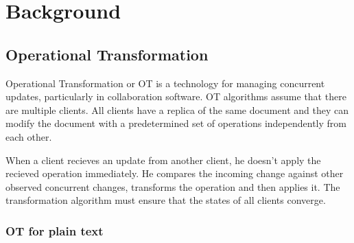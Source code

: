 \documentclass[a4paper, 11pt, oneside]{article}
\theoremstyle{definition}
\begin{document}
\section{Background}

\subsection{Operational Transformation}

Operational Transformation \cite{ot} or OT is a technology for managing concurrent updates, particularly in collaboration software. OT algorithms assume that there are multiple clients. All clients have a replica of the same document and they can modify the document with a predetermined set of operations independently from each other.

When a client recieves an update from another client, he doesn't apply the recieved operation immediately. He compares the incoming change against other observed concurrent changes, transforms the operation and then applies it. The transformation algorithm must ensure that the states of all clients converge.

\subsubsection{OT for plain text}
\end{document}
